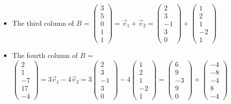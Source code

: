 \documentclass[conference,final,11pt,technote,onecolumn]{IEEEtran}\usepackage[]{graphicx}\usepackage[]{color}
\begin{document}
\begin{itemize}
	\item The third column of $B$ = $\begin{pmatrix}3\\5\\0\\1\\1\end{pmatrix} = \vec v_1 + \vec v_2 = \begin{pmatrix}2\\3\\-1\\3\\0\end{pmatrix} + \begin{pmatrix}1\\2\\1\\-2\\1\end{pmatrix}$
	\item The fourth column of $B$ = $\begin{pmatrix}2\\1\\-7\\17\\-4\end{pmatrix} = 3\vec v_1 -4\vec v_2 = 3 \begin{pmatrix}2\\3\\-1\\3\\0\end{pmatrix} - 4 \begin{pmatrix}1\\2\\1\\-2\\1\end{pmatrix} = \begin{pmatrix}6\\9\\-3\\9\\0\end{pmatrix} + \begin{pmatrix}-4\\-8\\-4\\8\\-4\end{pmatrix}$
\end{itemize}
\end{document}
